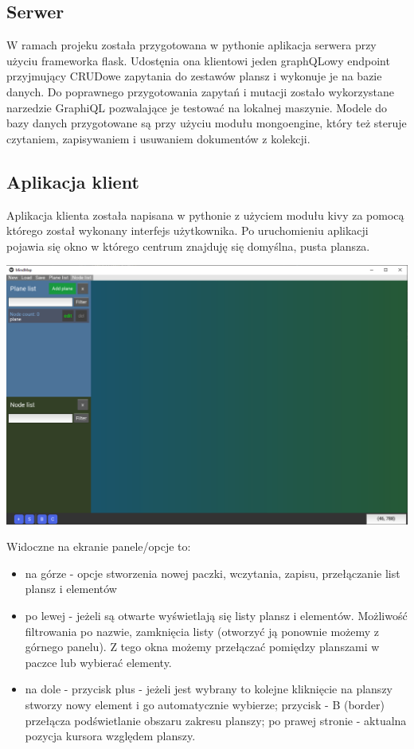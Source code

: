 \documentclass[a4paper,11pt]{article}
\begin{document}
\subsection{Serwer}
W ramach projeku została przygotowana w pythonie aplikacja serwera przy użyciu frameworka flask. Udostęnia ona klientowi jeden graphQLowy endpoint przyjmujący CRUDowe zapytania do zestawów plansz i wykonuje je na bazie danych. Do poprawnego przygotowania zapytań i mutacji zostało wykorzystane narzedzie GraphiQL pozwalające je testować na lokalnej maszynie. Modele do bazy danych przygotowane są przy użyciu modułu mongoengine, który też steruje czytaniem, zapisywaniem i usuwaniem dokumentów z kolekcji.

\subsection{Aplikacja klient}
Aplikacja klienta została napisana w pythonie z użyciem modułu kivy za pomocą którego został wykonany interfejs użytkownika. Po uruchomieniu aplikacji pojawia się okno w którego centrum znajduję się domyślna, pusta plansza.

\begin{center}
    \includegraphics[width=16cm]{img/main_screen.png}
\end{center}

Widoczne na ekranie panele/opcje to:

\begin{itemize}
    \item na górze - opcje stworzenia nowej paczki, wczytania, zapisu, przełączanie list plansz i elementów
    \item po lewej - jeżeli są otwarte wyświetlają się listy plansz i elementów. Możliwość filtrowania po nazwie, zamknięcia listy (otworzyć ją ponownie możemy z górnego panelu). Z tego okna możemy przełączać pomiędzy planszami w paczce lub wybierać elementy.
    \item na dole - przycisk plus - jeżeli jest wybrany to kolejne kliknięcie na planszy stworzy nowy element i go automatycznie wybierze; przycisk - B (border) przełącza podświetlanie obszaru zakresu planszy; po prawej stronie - aktualna pozycja kursora względem planszy.
\end{itemize}
\end{document}
